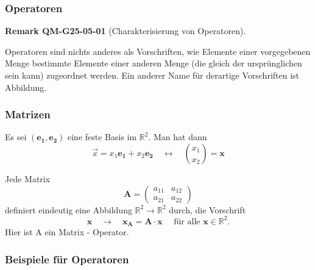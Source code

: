 \documentclass[10pt, letterpaper]{article}
\newcommand{\CustomHeading}[3]{%
  \par\medskip\noindent%
  \textbf{#1 #2} \textnormal{(#3)}.\enskip%
}
\newenvironment{REM}[2]{\begin{unitbox}\CustomHeading{Remark}{#1}{#2}}{\end{unitbox}}
\begin{document}
\subsubsection{Operatoren}



\begin{REM}{QM-G25-05-01}{Charakterisierung von Operatoren}
Operatoren sind nichts anderes als Vorschriften, wie Elemente einer vorgegebenen Menge bestimmte Elemente einer anderen Menge (die gleich der ursprünglichen sein kann) zugeordnet werden. Ein anderer Name für derartige Vorschriften ist Abbildung.
\end{REM}

\subsubsection*{Matrizen}


Es sei $\left(\mathbf{e}_{\mathbf{1}}, \mathbf{e}_{\mathbf{2}}\right)$ eine feste Basis im $\mathbb{R}^{2}$. Man hat dann
$$
\vec{x}=x_{1} \mathbf{e}_{\mathbf{1}}+x_{2} \mathbf{e}_{\mathbf{2}} \quad \leftrightarrow \quad\binom{x_{1}}{x_{2}}=\mathbf{x}
$$

Jede Matrix
$$
\mathbf{A}=\left(\begin{array}{ll}
a_{11} & a_{12} \\
a_{21} & a_{22}
\end{array}\right)
$$
definiert eindeutig eine Abbildung $\mathbb{R}^{2} \rightarrow \mathbb{R}^{2}$ durch, die Vorschrift
$$
\mathbf{x} \quad \rightarrow \quad \mathbf{x}_{\mathbf{A}}=\mathbf{A} \cdot \mathbf{x} \quad \text { für alle } \mathbf{x} \in \mathbb{R}^{2} .
$$
Hier ist A ein Matrix - Operator.


\subsubsection*{Beispiele für Operatoren}
\end{document}
